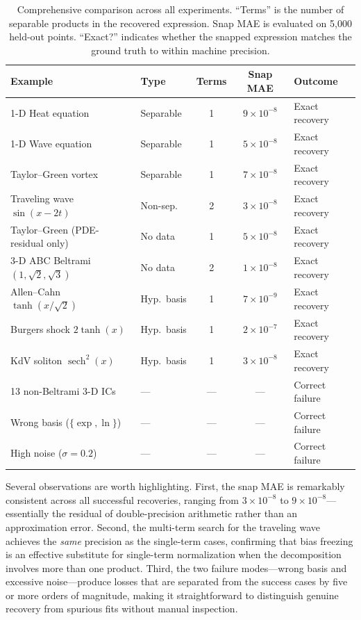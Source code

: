 \begin{table}[t]
  \centering
  \caption{Comprehensive comparison across all experiments.  ``Terms'' is the
    number of separable products in the recovered expression.  Snap MAE is
    evaluated on 5{,}000 held-out points.  ``Exact?'' indicates whether the
    snapped expression matches the ground truth to within machine precision.}
  \label{tab:summary}
  \smallskip
  \begin{tabular}{@{}llccl@{}}
    \toprule
    Example & Type & Terms & Snap MAE & Outcome \\
    \midrule
    1-D Heat equation
      & Separable   & 1 & $9\!\times\!10^{-8}$ & Exact recovery \\
    1-D Wave equation
      & Separable   & 1 & $5\!\times\!10^{-8}$ & Exact recovery \\
    Taylor--Green vortex
      & Separable   & 1 & $7\!\times\!10^{-8}$ & Exact recovery \\
    Traveling wave $\sin(x\!-\!2t)$
      & Non-sep.\ & 2 & $3\!\times\!10^{-8}$ & Exact recovery \\
    Taylor--Green (PDE-residual only)
      & No data   & 1 & $5\!\times\!10^{-8}$ & Exact recovery \\
    3-D ABC Beltrami $(1,\!\sqrt{2},\!\sqrt{3})$
      & No data   & 2 & $1\!\times\!10^{-8}$ & Exact recovery \\
    Allen--Cahn $\tanh(x/\!\sqrt{2})$
      & Hyp.\ basis  & 1 & $7\!\times\!10^{-9}$ & Exact recovery \\
    Burgers shock $2\tanh(x)$
      & Hyp.\ basis  & 1 & $2\!\times\!10^{-7}$ & Exact recovery \\
    KdV soliton $\operatorname{sech}^{2}(x)$
      & Hyp.\ basis  & 1 & $3\!\times\!10^{-8}$ & Exact recovery \\
    \midrule
    13 non-Beltrami 3-D ICs
      & ---         & --- & ---                 & Correct failure \\
    Wrong basis ($\{\exp,\ln\}$)
      & ---         & --- & ---                 & Correct failure \\
    High noise ($\sigma\!=\!0.2$)
      & ---         & --- & ---                 & Correct failure \\
    \bottomrule
  \end{tabular}
\end{table}

Several observations are worth highlighting.  First, the snap MAE is
remarkably consistent across all successful recoveries, ranging from
$3\times 10^{-8}$ to $9\times 10^{-8}$---essentially the residual of
double-precision arithmetic rather than an approximation error.  Second, the
multi-term search for the traveling wave achieves the \emph{same} precision as
the single-term cases, confirming that bias freezing is an effective substitute
for single-term normalization when the decomposition involves more than one
product.  Third, the two failure modes---wrong basis and excessive
noise---produce losses that are separated from the success cases by five or
more orders of magnitude, making it straightforward to distinguish genuine
recovery from spurious fits without manual inspection.

